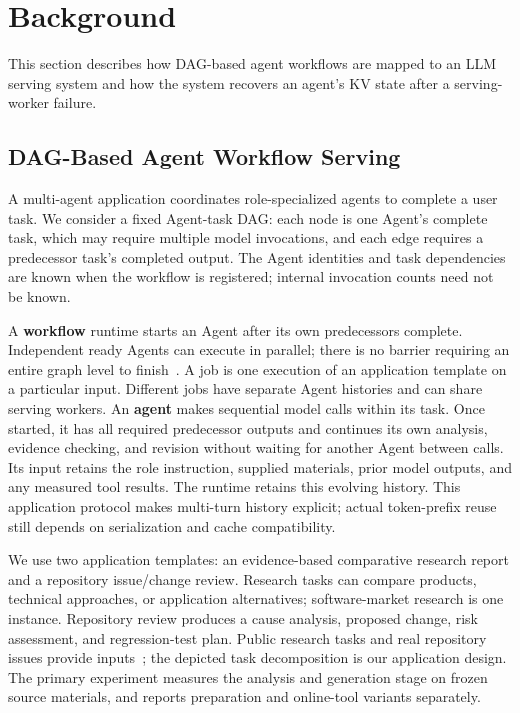 \section{Background} \label{sec:background} 

This section describes how DAG-based agent workflows are mapped to an LLM serving system and how the system recovers an agent's KV state after a serving-worker failure.

\subsection{DAG-Based Agent Workflow Serving} \label{sec:background:serving} 

A multi-agent application coordinates role-specialized agents to complete a user task. We consider a fixed Agent-task DAG: each node is one Agent's complete task, which may require multiple model invocations, and each edge requires a predecessor task's completed output. The Agent identities and task dependencies are known when the workflow is registered; internal invocation counts need not be known.

A \textbf{workflow} runtime starts an Agent after its own predecessors complete. Independent ready Agents can execute in parallel; there is no barrier requiring an entire graph level to finish~\cite{lin2024parrot}. A job is one execution of an application template on a particular input. Different jobs have separate Agent histories and can share serving workers.
%
An \textbf{agent} makes sequential model calls within its task. Once started, it has all required predecessor outputs and continues its own analysis, evidence checking, and revision without waiting for another Agent between calls. Its input retains the role instruction, supplied materials, prior model outputs, and any measured tool results. The runtime retains this evolving history. This application protocol makes multi-turn history explicit; actual token-prefix reuse still depends on serialization and cache compatibility.

We use two application templates: an evidence-based comparative research report and a repository issue/change review. Research tasks can compare products, technical approaches, or application alternatives; software-market research is one instance. Repository review produces a cause analysis, proposed change, risk assessment, and regression-test plan. Public research tasks and real repository issues provide inputs~\cite{du2025deepresearch,li2026deepresearchii,swebenchverified}; the depicted task decomposition is our application design. The primary experiment measures the analysis and generation stage on frozen source materials, and reports preparation and online-tool variants separately.



